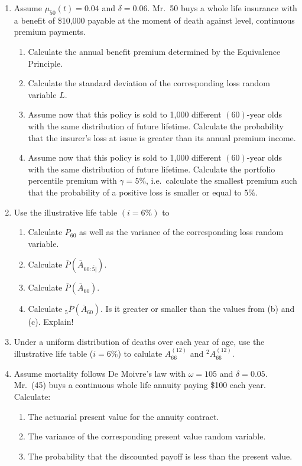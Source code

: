 \documentclass[11pt,fleqn,oneside]{book}
\begin{document}
\begin{enumerate}
\item Assume $\mu_{50}(t)=0.04$ and $\delta=0.06$. Mr.\ 50 buys a whole life insurance with a benefit of \$10,000 payable at the moment of death against level, continuous premium payments.
\begin{enumerate}
\item Calculate the annual benefit premium determined by the Equivalence Principle.
\item Calculate the standard deviation of the corresponding loss random variable $L$.
\item Assume now that this policy is sold to 1,000 different $(60)$-year olds with the same distribution of future lifetime. Calculate the probability that the insurer's loss at issue is greater than its annual premium income.
\item Assume now that this policy is sold to 1,000 different $(60)$-year olds with the same distribution of future lifetime. Calculate the portfolio percentile premium with $\gamma=5\%$, i.e.\ calculate the smallest premium such that the probability of a positive loss is smaller or equal to $5\%$.
\end{enumerate}
\item Use the illustrative life table $(i=6\%)$ to
\begin{enumerate}
\item Calculate $P_{60}$ as well as the variance of the corresponding loss random variable.
\item Calculate $\bar{P}(\bar{A}_{60:\overline{5}|})$.
\item Calculate $\bar{P}(\bar{A}_{60})$.
\item Calculate $_5\bar{P}(\bar{A}_{60})$. Is it greater or smaller than the values from (b) and (c). Explain!
\end{enumerate}
\item Under a uniform distribution of deaths over each year of age, use the illustrative life table ($i=6\%$) to calulate $A_{66}^{(12)}$ and $^2A_{66}^{(12)}$.
\item Assume mortality follows De Moivre's law with $\omega = 105$ and $\delta = 0.05$. Mr.\ (45) buys a continuous whole life annuity paying \$100 each year. Calculate:
\begin{enumerate}
\item The actuarial present value for the annuity contract.
\item The variance of the corresponding present value random variable.
\item The probability that the discounted payoff is less than the present value.

\end{enumerate}
\end{enumerate}
\end{document}
